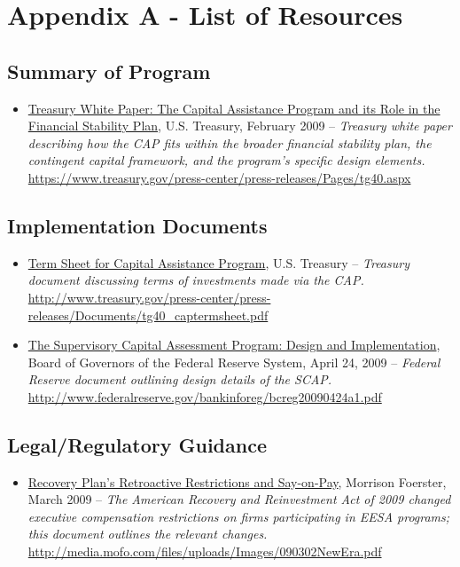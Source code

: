 \documentclass[12pt]{article}
\begin{document}
\section{Appendix A - List of Resources}

\subsection{Summary of Program}

\begin{itemize}

\item
\ul{Treasury White Paper: The Capital Assistance Program and its Role in the Financial Stability Plan}, U.S. Treasury, February 2009 -- \emph{Treasury white paper describing how the CAP fits within the broader financial stability plan, the contingent capital framework, and the program's specific design elements.} \url{https://www.treasury.gov/press-center/press-releases/Pages/tg40.aspx}
\end{itemize}

\subsection{Implementation Documents}
\begin{itemize}
\item
\ul{Term
 Sheet for Capital Assistance Program}, U.S. Treasury -- \emph{Treasury
 document discussing terms of investments made via the CAP.} \url{http://www.treasury.gov/press-center/press-releases/Documents/tg40_captermsheet.pdf}
\item
\ul{The
 Supervisory Capital Assessment Program: Design and Implementation},
 Board of Governors of the Federal Reserve System, April 24, 2009 -- \emph{Federal Reserve document outlining design details of the SCAP.} \url{http://www.federalreserve.gov/bankinforeg/bcreg20090424a1.pdf}
\end{itemize}

\subsection{Legal/Regulatory Guidance}

\begin{itemize}
\item
\ul{Recovery Plan's Retroactive Restrictions and Say-on-Pay}, Morrison Foerster, March 2009 -- \emph{The American Recovery and Reinvestment Act of 2009 changed executive compensation restrictions on firms participating in EESA programs; this document outlines the relevant changes.} \url{http://media.mofo.com/files/uploads/Images/090302NewEra.pdf}
\end{itemize}
\end{document}

